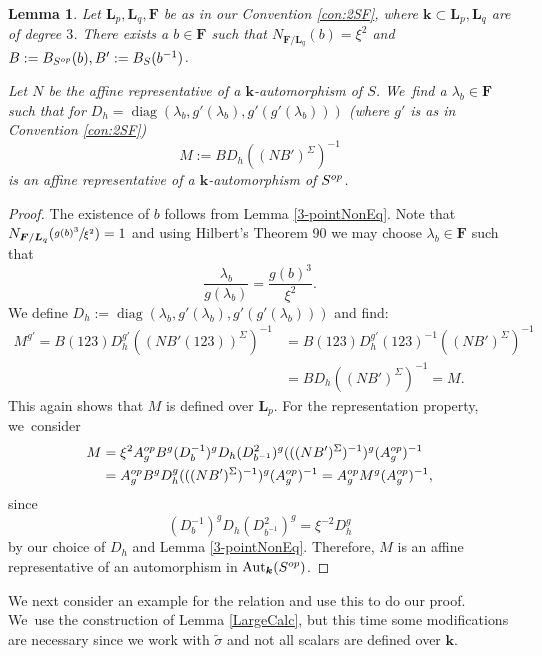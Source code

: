 \documentclass[10pt,a4paper]{amsart}
\newcommand{\op}{\textup{op}}
\DeclareMathOperator{\diag}{diag}
\newtheorem{lemma}[theorem]{Lemma}
\theoremstyle{definition}
\newcommand{\kk}{{\boldsymbol{k}}}
\newcommand{\FF}{{\boldsymbol{F}}}
\newcommand{\LL}{{\boldsymbol{L}}}
\DeclareMathOperator{\Aut}{Aut}
\begin{document}
\begin{lemma} \label{A3}
Let $\LL_p, \LL_q,\FF$ be as in our Convention \ref{con:2SF}, where $\kk \subset \LL_p, \LL_q$ are of degree $3$. There exists a $b \in \FF$ such that $N_{\FF/\LL_q}(b) = \xi^2$ and $B:= B_{S^{\op}}(b), B':= B_S(b^{-1})$.

Let $N$ be the affine representative of a $\kk$-automorphism of $S$. We~find a $\lambda_b \in \FF$ such that for $D_h = \diag(\lambda_b, g'(\lambda_b), g'(g'(\lambda_b)))$ (where $g'$ is as in Convention \ref{con:2SF})
\[
M := B D_h ((NB')^{\Sigma})^{-1}
\]
is an affine representative of a $\kk$-automorphism of $S^{\op}$.
\end{lemma}

\begin{proof}
The existence of $b$ follows from Lemma \ref{3-pointNonEq}. Note that $N_{\FF/\LL_q}(\sfrac{g(b)^3}{\xi^2}) = 1$ and using Hilbert's Theorem 90 we may choose $\lambda_b \in \FF$ such that\vspace*{-3pt}
\[
\frac{\lambda_b}{g(\lambda_b)} = \frac{g(b)^3}{\xi^2}.
\]
We define $D_h := \diag(\lambda_b, g'(\lambda_b),g'(g'(\lambda_b)))$ and find:
\begin{align*}
M^{g'} = B (123) D_h^{g'} ((N B' (123))^{\Sigma})^{-1} &= B (123) D_h^{g'} (123)^{-1} ((NB')^{\Sigma})^{-1}
\\
&= B D_h ((NB')^{\Sigma})^{-1} = M.
\end{align*}
This again shows that $M$ is defined over $\LL_p$. For the representation property, we~consider\vspace*{-3pt}
\begin{align*}
M &= \xi^2 A_g^{\op} B^g (D_b^{-1})^g D_h (D_{b^{-1}}^2)^g (((NB')^{\Sigma})^{-1})^g (A_g^{\op})^{-1}
\\
&= A_g^{\op} B^g D_h^g (((NB')^{\Sigma})^{-1})^g (A_g^{\op})^{-1} = A_g^{\op} M^g (A_g^{\op})^{-1},
\end{align*}
since\vspace*{-3pt}
\[
(D_b^{-1})^g D_h (D_{b^{-1}}^2)^g = \xi^{-2}D_h^g
\]
by our choice of $D_h$ and Lemma \ref{3-pointNonEq}. Therefore, $M$ is an affine representative of an automorphism in $\Aut_{\kk}(S^{\op})$.
\end{proof}

We next consider an example for the relation and use this to do our proof. We~use the construction of Lemma \ref{LargeCalc}, but this time some modifications are necessary since we work with $\tilde \sigma$ and not all scalars are defined over $\kk$.
\end{document}
